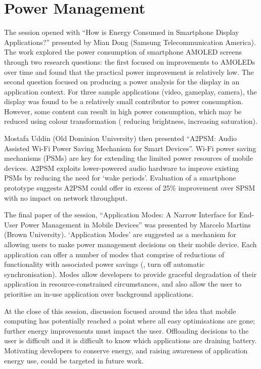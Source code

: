 \section{Power Management}
\label{sec:power}
The session %
opened with
``How is Energy Consumed in Smartphone Display Applications?'' presented by Mian Dong (Samsung Telecommunication America). The work explored
the power consumption of smartphone AMOLED screens through two research questions: the first focused on improvements to AMOLEDs over time
and found that the practical power improvement is relatively low.
The second question focused on 
producing a power analysis for the display in an application context. For three 
sample applications (video, gameplay, camera), the display was found to be a 
relatively small contributor to power consumption. However, some content can result in high power consumption, which may be reduced using colour 
transformation (\eg{} reducing brightness, increasing saturation).

Mostafa Uddin (Old Dominion University) then presented ``A2PSM: Audio Assisted 
Wi-Fi Power Saving Mechanism for Smart Devices''. Wi-Fi power saving mechanisms 
(PSMs) are key for extending the limited power resources of mobile devices. 
A2PSM exploits lower-powered audio hardware to 
improve existing PSMs by reducing the need for `wake periods'. 
Evaluation of a smartphone prototype suggests A2PSM could offer in excess of 25\%
improvement over SPSM with no impact on network throughput.

The final paper of the session, ``Application Modes: A Narrow Interface for End-
User Power Management in Mobile Devices'' was presented by Marcelo Martins (Brown 
University). `Application Modes' are suggested as a mechanism for allowing 
users to make power management decisions on their mobile device. Each 
application can offer a number of modes that comprise of reductions of 
functionality with associated power savings (\eg{}, turn off automatic 
synchronisation). Modes allow developers to provide graceful degradation of their 
application in resource-constrained circumstances, and also allow the user to 
prioritise an in-use application over background applications.

At the close of this session, discussion focused around the idea
that mobile computing has potentially reached a point where all easy 
optimisations are gone; further energy improvements must impact the 
user. Offloading decisions to the user is difficult and it is difficult to 
know which applications are draining battery. Motivating 
developers to conserve energy, and raising awareness of application energy use, 
could be targeted in future work. %
